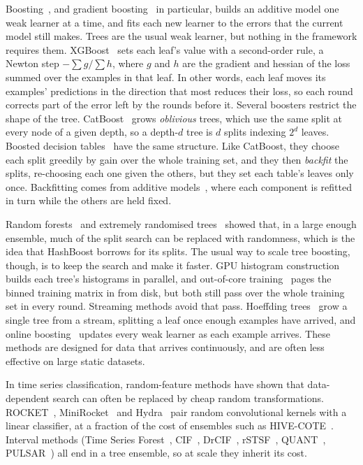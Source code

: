 \documentclass[a4paper, 11pt]{article}
\begin{document}
Boosting~\cite{freund1997decision}, and gradient boosting~\cite{friedman2001greedy}
in particular, builds an
additive model one weak learner at a time, and fits each new learner to the
errors that the current model still makes. Trees are the usual weak learner,
but nothing in the framework requires them. XGBoost~\cite{chen2016xgboost}
sets each leaf's value with a second-order rule, a Newton step $-\sum g /
\sum h$, where $g$ and $h$ are the gradient and hessian of the loss summed
over the examples in that leaf. In other words, each leaf moves its examples'
predictions in the direction that most reduces their loss, so each round
corrects part of the error left by the rounds before it. Several boosters
restrict the shape of the tree. CatBoost~\cite{prokhorenkova2018catboost}
grows \emph{oblivious} trees, which use the same split at every node of a
given depth, so a depth-$d$ tree is $d$ splits indexing $2^d$ leaves.
Boosted decision tables~\cite{lou2017bdt} have the same structure. Like
CatBoost, they choose each split greedily by gain over the whole training
set, and they then \emph{backfit} the splits, re-choosing each one given the
others, but they set each table's leaves only once. Backfitting comes from
additive models~\cite{buja1989linear}, where each component is refitted in
turn while the others are held fixed.

Random forests~\cite{breiman2001random} and extremely randomised
trees~\cite{geurts2006extremely} showed that, in a large enough ensemble,
much of the split search can be replaced with randomness, which is the idea that
HashBoost borrows for its splits. The usual way to
scale tree boosting, though, is to keep the search and make it faster. GPU
histogram construction~\cite{mitchell2017accelerating} builds each tree's
histograms in parallel, and out-of-core training~\cite{chen2016xgboost}
pages the binned training matrix in from disk, but both still pass over the
whole training set in every round. Streaming methods avoid that pass.
Hoeffding trees~\cite{domingos2000mining} grow a single tree from a stream,
splitting a leaf once enough examples have arrived, and online
boosting~\cite{oza2001online,beygelzimer2015online} updates every weak
learner as each example arrives. These methods are designed for data that
arrives continuously, and are often less effective on large static datasets.

In time series classification, random-feature methods have shown that
data-dependent search can often be replaced by cheap random transformations.
ROCKET~\cite{dempster2020rocket},
MiniRocket~\cite{dempster2021minirocket} and Hydra~\cite{dempster2023hydra}
pair random convolutional kernels with a linear classifier, at a fraction of
the cost of ensembles such as HIVE-COTE~\cite{middlehurst2021hivecote2}.
Interval methods (Time Series Forest~\cite{deng2013tsf},
CIF~\cite{middlehurst2020cif}, DrCIF~\cite{middlehurst2021hivecote2},
rSTSF~\cite{cabello2021rstsf}, QUANT~\cite{dempster2024quant},
PULSAR~\cite{pulsar}) all end in a tree ensemble, so at scale they inherit
its cost.
\end{document}
